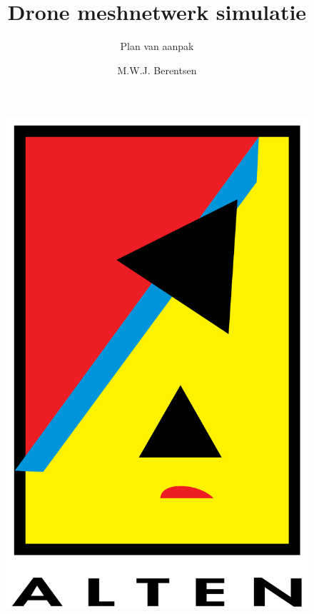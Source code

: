 \documentclass[a4paper, 11pt, oneside]{report}
\author{M.W.J. Berentsen}
\title{\myfont Drone meshnetwerk simulatie}
\subtitle{Plan van aanpak}{Versie 2.1}{Alten Nederland B.V.}{Hogeschool van Arnhem en Nijmegen}{HBO Technische Informatica - Embedded Software Developement }{MWJ.Berentsen@student.han.nl}{Studentnummer: 561399}{Docent: J. Visch, MSc}{Assessor: ir. C.G.R. van Uffelen}
\begin{document}
\begin{figure}
\begin{center}\includegraphics[scale=0.1]{alten}\end{center}
\end{figure}
\maketitle

\end{document}
